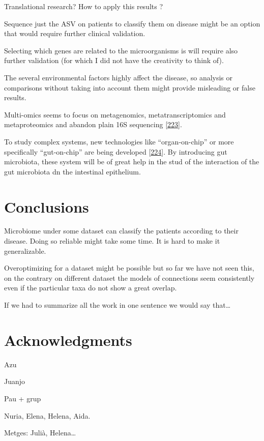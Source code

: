 \documentclass[
  a4paper,
]{book}
\begin{document}
Translational research?
How to apply this results ?

Sequence just the ASV on patients to classify them on disease might be an option that would require further clinical validation.

Selecting which genes are related to the microorganisms is will require also further validation (for which I did not have the creativity to think of).

The several environmental factors highly affect the disease, so analysis or comparisons without taking into account them might provide misleading or false results.

Multi-omics seems to focus on metagenomics, metatranscriptomics and metaproteomics and abandon plain 16S sequencing {[}\protect\hyperlink{ref-zhang2019}{223}{]}.

To study complex systems, new technologies like ``organ-on-chip'' or more specifically ``gut-on-chip'' are being developed {[}\protect\hyperlink{ref-collij2021}{224}{]}.
By introducing gut microbiota, these system will be of great help in the stud of the interaction of the gut microbiota dn the intestinal epithelium.

\hypertarget{conclusions}{%
\chapter{Conclusions}\label{conclusions}}

Microbiome under some dataset can classify the patients according to their disease.
Doing so reliable might take some time.
It is hard to make it generalizable.

Overoptimizing for a dataset might be possible but so far we have not seen this, on the contrary on different dataset the models of connections seem consistently even if the particular taxa do not show a great overlap.

If we had to summarize all the work in one sentence we would say that\ldots{}

\hypertarget{acknowledgments}{%
\chapter{Acknowledgments}\label{acknowledgments}}

Azu

Juanjo

Pau + grup

Nuria, Elena, Helena, Aida.

Metges: Julià, Helena\ldots{}
\end{document}
